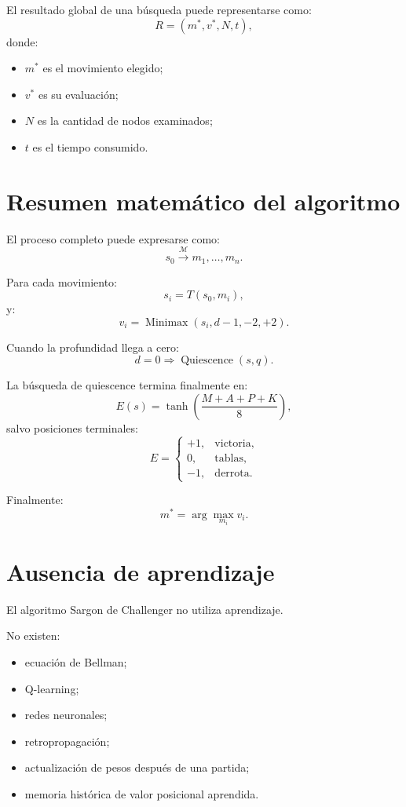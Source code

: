 \documentclass[11pt,a4paper]{article}
\begin{document}
El resultado global de una búsqueda puede representarse como:
\[
R=(m^\ast,v^\ast,N,t),
\]
donde:

\begin{itemize}
    \item $m^\ast$ es el movimiento elegido;
    \item $v^\ast$ es su evaluación;
    \item $N$ es la cantidad de nodos examinados;
    \item $t$ es el tiempo consumido.
\end{itemize}

\section{Resumen matemático del algoritmo}

El proceso completo puede expresarse como:
\[
s_0
\xrightarrow{\mathcal M}
m_1,\ldots,m_n.
\]

Para cada movimiento:
\[
s_i=T(s_0,m_i),
\]
y:
\[
v_i=
\operatorname{Minimax}
(s_i,d-1,-2,+2).
\]

Cuando la profundidad llega a cero:
\[
d=0
\Rightarrow
\operatorname{Quiescence}(s,q).
\]

La búsqueda de quiescence termina finalmente en:
\[
E(s)=
\tanh
\left(
\frac{M+A+P+K}{8}
\right),
\]
salvo posiciones terminales:
\[
E=
\begin{cases}
+1, & \text{victoria},\\
0, & \text{tablas},\\
-1, & \text{derrota}.
\end{cases}
\]

Finalmente:
\[
\boxed{
m^\ast=
\arg\max_{m_i}v_i
}.
\]

\section{Ausencia de aprendizaje}

El algoritmo Sargon de Challenger no utiliza aprendizaje.

No existen:

\begin{itemize}
    \item ecuación de Bellman;
    \item Q-learning;
    \item redes neuronales;
    \item retropropagación;
    \item actualización de pesos después de una partida;
    \item memoria histórica de valor posicional aprendida.
\end{itemize}
\end{document}
